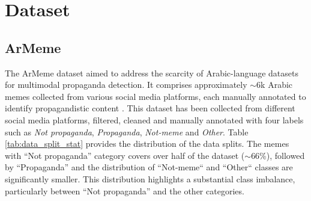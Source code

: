 \section{Dataset}
\label{sec:dataset}
\subsection{ArMeme}
The ArMeme dataset aimed to address the scarcity of Arabic-language datasets for multimodal propaganda detection. It comprises approximately $\sim$6k Arabic memes collected from various social media platforms, each manually annotated to identify propagandistic content \cite{alam-etal-2024-armeme}. This dataset has been collected from different social media platforms, filtered, cleaned and manually annotated with four labels such as \textit{Not propaganda}, \textit{Propaganda}, \textit{Not-meme} and \textit{Other}. Table \ref{tab:data_split_stat} provides the distribution of the data splits. The memes with ``Not propaganda'' category covers over half of the dataset ($\sim$66\%), followed by ``Propaganda'' and the distribution of ``Not-meme`` and ``Other`` classes are significantly smaller. This distribution highlights a substantial class imbalance, particularly between ``Not propaganda'' and the other categories. 


\begin{table}[h]
\centering
\setlength{\tabcolsep}{3pt} 
\caption{Data splits for ArMeme datasets.}
\label{tab:data_split_stat}
\end{table}


